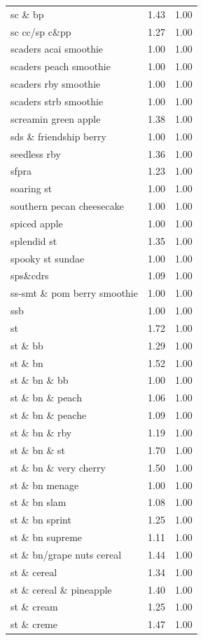 \begin{table}
\begin{tabular}{lrr}
sc \& bp & 1.43 & 1.00 \\
sc cc/sp c\&pp & 1.27 & 1.00 \\
scaders acai smoothie & 1.00 & 1.00 \\
scaders peach smoothie & 1.00 & 1.00 \\
scaders rby smoothie & 1.00 & 1.00 \\
scaders strb smoothie & 1.00 & 1.00 \\
screamin green apple & 1.38 & 1.00 \\
sds \& friendship berry & 1.00 & 1.00 \\
seedless rby & 1.36 & 1.00 \\
sfpra & 1.23 & 1.00 \\
soaring st & 1.00 & 1.00 \\
southern pecan cheesecake & 1.00 & 1.00 \\
spiced apple & 1.00 & 1.00 \\
splendid st & 1.35 & 1.00 \\
spooky st sundae & 1.00 & 1.00 \\
sps\&cdrs & 1.09 & 1.00 \\
ss-smt \& pom berry smoothie & 1.00 & 1.00 \\
ssb & 1.00 & 1.00 \\
st & 1.72 & 1.00 \\
st \& bb & 1.29 & 1.00 \\
st \& bn & 1.52 & 1.00 \\
st \& bn \& bb & 1.00 & 1.00 \\
st \& bn \& peach & 1.06 & 1.00 \\
st \& bn \& peache & 1.09 & 1.00 \\
st \& bn \& rby & 1.19 & 1.00 \\
st \& bn \& st & 1.70 & 1.00 \\
st \& bn \& very cherry & 1.50 & 1.00 \\
st \& bn menage & 1.00 & 1.00 \\
st \& bn slam & 1.08 & 1.00 \\
st \& bn sprint & 1.25 & 1.00 \\
st \& bn supreme & 1.11 & 1.00 \\
st \& bn/grape nuts cereal & 1.44 & 1.00 \\
st \& cereal & 1.34 & 1.00 \\
st \& cereal \& pineapple & 1.40 & 1.00 \\
st \& cream & 1.25 & 1.00 \\
st \& creme & 1.47 & 1.00 \\

\end{tabular}
\end{table}

